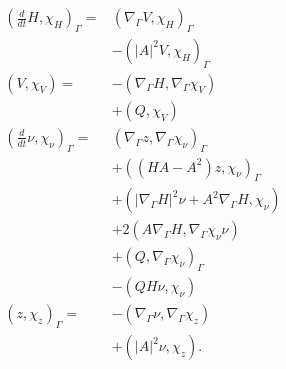 \begin{subequations}
\begin{align}
\label{eq:WE_weak_form}
\left( \frac{d}{dt}H, \chi _{H} \right)_{\Gamma } =&  \left( \nabla _{\Gamma } V, \chi _{H} \right) _{\Gamma } \nonumber \\
                                                   &- \left( \left\lvert A \right\rvert ^2 V, \chi _{H} \right) _{\Gamma }   \\
\left( V, \chi _{V} \right) =& -\left( \nabla _{\Gamma } H, \nabla _{\Gamma } \chi _{V} \right) \nonumber \\
 & + \left( Q, \chi _{V} \right)   \\
\left( \frac{d}{dt} \nu , \chi _{\nu } \right)_{\Gamma } =& \left( \nabla _{\Gamma }z, \nabla _{\Gamma } \chi _{\nu } \right) _{\Gamma }\nonumber   \\
 & + \left( ( HA - A^2  )z,\chi_\nu  \right)_{\Gamma }   \nonumber \\
& + \left( \left\lvert \nabla _{\Gamma } H \right\rvert^2 \nu + A^2\nabla _{\Gamma } H, \chi _{\nu }  \right) \nonumber  \\
 & + 2 \left( A \nabla _{\Gamma } H, \nabla _{\Gamma } \chi _{\nu } \nu  \right)\nonumber    \\
 &  + \left( Q, \nabla _{\Gamma } \chi _{\nu }  \right)_{\Gamma } \nonumber  \\
  &- \left( QH\nu , \chi _{\nu } \right) \\
\left( z, \chi _{z} \right) _{\Gamma }  =& - \left( \nabla _{\Gamma } \nu , \nabla _{\Gamma } \chi _{z} \right) \nonumber \\
 & + \left( \left\lvert A \right\rvert ^2 \nu , \chi _{z} \right)
.\end{align}
\end{subequations}













